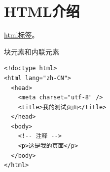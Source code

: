 \section{HTML介绍}
\href{https://developer.mozilla.org/en-US/docs/Web/HTML/Reference/Elements}{html标签}。

块元素和内联元素
\begin{code}[title=HTML示例]
	\begin{verbatim}
<!doctype html>
<html lang="zh-CN">
  <head>
    <meta charset="utf-8" />
    <title>我的测试页面</title>
  </head>
  <body>
    <!-- 注释 -->
    <p>这是我的页面</p>
  </body>
</html>
    \end{verbatim}
\end{code}
